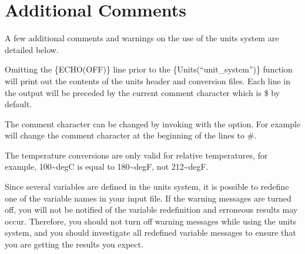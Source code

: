 \section{Additional Comments}

A few additional comments and warnings on the use of the units system are detailed 
below.

Omitting the \{ECHO(OFF)\} line prior to the \{Units(``unit\_system'')\} 
function will print out the contents of the units header and conversion files. 
Each line in the output will be preceded by the current comment character which 
is \$ by default.

The comment character can be changed by invoking \aprepro{} with the 
 option. For example  
will change the comment character at the beginning of the lines to \#. 

The temperature conversions are only valid for relative temperatures, for 
example, 100\textasciitilde{}degC is equal to 180\textasciitilde{}degF, not 212\textasciitilde{}degF. 

Since several variables are defined in the units system, it is
possible to redefine one of the variable names in your input file. If
the \aprepro{} warning messages are turned off, you will not be
notified of the variable redefinition and erroneous results may
occur. Therefore, you should not turn off \aprepro{} warning
messages while using the units system, and you should investigate all
redefined variable messages to ensure that you are getting the results
you expect. 

